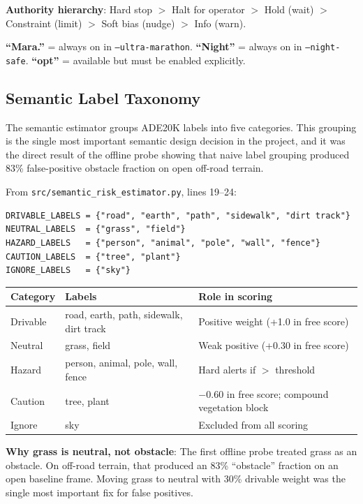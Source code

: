 \documentclass[11pt]{article}
\begin{document}
\textbf{Authority hierarchy}: Hard stop $>$ Halt for operator $>$ Hold (wait) $>$ Constraint (limit) $>$ Soft bias (nudge) $>$ Info (warn).

\textbf{``Mara.''} = always on in \texttt{--ultra-marathon}. \textbf{``Night''} = always on in \texttt{--night-safe}. \textbf{``opt''} = available but must be enabled explicitly.

\subsection{Semantic Label Taxonomy}

The semantic estimator groups ADE20K labels into five categories. This grouping is
the single most important semantic design decision in the project, and it was the
direct result of the offline probe showing that naive label grouping produced 83\%
false-positive obstacle fraction on open off-road terrain.

From \texttt{src/semantic\_risk\_estimator.py}, lines 19--24:

\begin{lstlisting}
DRIVABLE_LABELS = {"road", "earth", "path", "sidewalk", "dirt track"}
NEUTRAL_LABELS  = {"grass", "field"}
HAZARD_LABELS   = {"person", "animal", "pole", "wall", "fence"}
CAUTION_LABELS  = {"tree", "plant"}
IGNORE_LABELS   = {"sky"}
\end{lstlisting}

\begin{center}
\begin{tabular}{lll}
\toprule
\textbf{Category} & \textbf{Labels} & \textbf{Role in scoring} \\
\midrule
Drivable & road, earth, path, sidewalk, dirt track & Positive weight (+1.0 in free score) \\
Neutral & grass, field & Weak positive (+0.30 in free score) \\
Hazard & person, animal, pole, wall, fence & Hard alerts if $>$ threshold \\
Caution & tree, plant & $-0.60$ in free score; compound vegetation block \\
Ignore & sky & Excluded from all scoring \\
\bottomrule
\end{tabular}
\end{center}

\textbf{Why grass is neutral, not obstacle}: The first offline probe treated grass as
an obstacle. On off-road terrain, that produced an 83\% ``obstacle'' fraction on an
open baseline frame. Moving grass to neutral with 30\% drivable weight was the single
most important fix for false positives.
\end{document}
